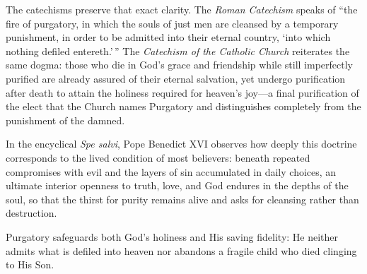 The catechisms preserve that exact clarity. The \textit{Roman Catechism} speaks of ``the fire of purgatory, in which the souls of just men are cleansed by a temporary punishment, in order to be admitted into their eternal country, `into which nothing defiled entereth.'\,'' The \textit{Catechism of the Catholic Church} reiterates the same dogma: those who die in God's grace and friendship while still imperfectly purified are already assured of their eternal salvation, yet undergo purification after death to attain the holiness required for heaven's joy---a final purification of the elect that the Church names Purgatory and distinguishes completely from the punishment of the damned.

In the encyclical \textit{Spe salvi}, Pope Benedict XVI observes how deeply this doctrine corresponds to the lived condition of most believers: beneath repeated compromises with evil and the layers of sin accumulated in daily choices, an ultimate interior openness to truth, love, and God endures in the depths of the soul, so that the thirst for purity remains alive and asks for cleansing rather than destruction.

Purgatory safeguards both God's holiness and His saving fidelity: He neither admits what is defiled into heaven nor abandons a fragile child who died clinging to His Son.
